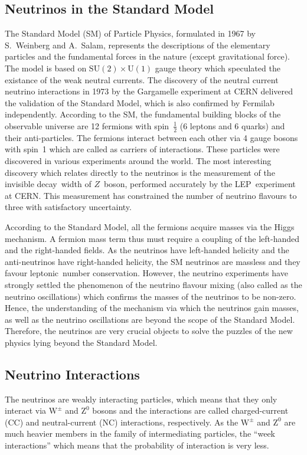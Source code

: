 \subsection{Neutrinos in the Standard Model}
The Standard Model (SM) of Particle Physics, formulated in 1967 by
S.~Weinberg and A.~Salam, represents the descriptions of the
elementary particles and the fundamental forces in the nature
(except gravitational force)\cite{weinberg1967,abdus1968}.
The model is based on
$\text{SU}\left(2\right)\times\text{U}\left(1\right)$ gauge theory
which speculated the existance of the weak neutral
currents\cite{glashow1961}.
The discovery of the neutral current neutrino interactions in 1973
by the Gargamelle experiment at CERN delivered the validation of the
Standard Model\cite{hasert1973,hasert1973_1,hasert1974}, which is
also confirmed by Fermilab independently\cite{benvenuti1974}.
According to the SM, the fundamental building blocks of the observable
universe are 12 fermions with spin~$\frac{1}{2}$ (6 leptons and
6 quarks) and their anti-particles. The fermions interact between
each other via 4 gauge bosons with spin~1 which are called as
carriers of interactions. These particles were discovered in various
experiments around the world. The most interesting discovery which
relates directly to the neutrinos is the measurement of the invisible
decay~width of $Z$~boson, performed accurately by the LEP~experiment
at CERN\cite{numberneut}. This measurement has constrained the number
of neutrino flavours to three with satisfactory uncertainty.

According to the Standard Model, all the fermions acquire masses via
the Higgs mechanism. A fermion mass term thus must require a coupling
of the left-handed and the right-handed fields. As the neutrinos have
left-handed helicity and the anti-neutrinos have right-handed
helicity, the SM neutrinos are massless and they favour
leptonic~number conservation. However, the neutrino experiments have
strongly settled the phenomenon of the neutrino flavour mixing
(also called as the neutrino oscillations) which confirms the masses
of the neutrinos to be non-zero. Hence, the understanding of the
mechanism via which the neutrinos gain masses, as well as the neutrino
oscillations are beyond the scope of the Standard Model. Therefore,
the neutrinos are very crucial objects to solve the puzzles of the
new physics lying beyond the Standard Model.


\subsection{Neutrino Interactions}
The neutrinos are weakly interacting particles, which means that they
only interact via $\mathrm{W}^{\pm}$ and $\mathrm{Z}^{0}$ bosons and the
interactions are called charged-current (CC) and neutral-current (NC)
interactions, respectively. As the $\mathrm{W}^{\pm}$ and
$\mathrm{Z}^{0}$ are much heavier members in the family of
intermediating particles, the ``week interactions'' which means that
the probability of interaction is very less.

